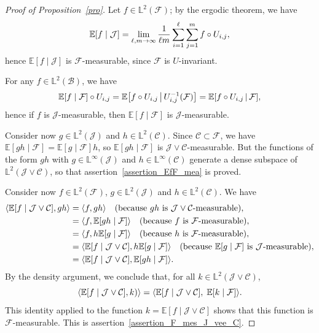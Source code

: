 \documentclass[10pt]{amsart}
\theoremstyle{definition}\newtheorem{defi}[theo]{Definition}\newtheorem{rema}[theo]{Remark}\newtheorem{exam}[theo]{Example}\newtheorem{exem}[theo]{Example}\newtheorem{nota}[theo]{Notation}
\newcommand*\bbL{\mathbb{L}}
\newcommand{\bbE}{\mathbb{E}}
\newcommand{\E}[1]{\bbE\left[#1\right]}
\newcommand*\J{\mathcal{J}}
\newcommand*\C{\mathcal{C}}
\newcommand*\B{\mathcal{B}}
\newcommand*\F{\mathcal{F}}
\renewcommand*{\to}{\mathchoice{\longrightarrow}{\rightarrow}{\rightarrow}{\rightarrow}}
\let\originalleft\left
\let\originalright\right
\renewcommand{\left}{\mathopen{}\mathclose\bgroup\originalleft}
\renewcommand{\right}{\aftergroup\egroup\originalright}
\begin{document}
\begin{proof}[Proof of Proposition~\ref{pro}]
Let $f\in \bbL^2(\F)$; by the ergodic theorem, we have
\[
\E{f\mid\J}=\lim_{\ell,m\to\infty}\frac1{\ell m}\sum_{i=1}^\ell \sum_{j=1}^mf\circ U_{i,j},
\]
hence $\bbE[f\mid\J]$ is $\F$-measurable, since $\F$ is $U$-invariant.

For any $f\in \bbL^2(\B)$, we have
\[
\E{f\mid\F}\circ U_{i,j}=\E{f\circ U_{i,j}\,\middle|\, U_{i,j}^{-1}(\F)}=\E{f\circ U_{i,j}\,\middle|\,\F},
\]
hence if $f$ is $\J$-measurable, then $\bbE[f\mid\F]$ is $\J$-measurable.

Consider now $g\in \bbL^2(\J)$ and $h\in \bbL^2(\C)$. Since $\C\subset \F$, we have $
\bbE[gh\mid\F]=\bbE[g\mid\F] h $, so $\bbE[gh\mid\F]$ is $\J\vee\C$-measurable. But the functions of the form $gh$ with $g\in \bbL^\infty(\J)$ and $h\in \bbL^\infty(\C)$ generate a dense subspace of $ \bbL^2(\J\vee\C)$, so that assertion~\eqref{assertion_EfF_mea} is proved.

Consider now $f\in \bbL^2(\F)$, $g\in \bbL^2(\J)$ and $h\in \bbL^2(\C)$. We have
\begin{align*}
\left\langle \E{f\mid\J\vee\C},gh\right\rangle &=\langle f,gh\rangle\quad\text{(because $gh$ is $\J\vee\C$-measurable)},\\
&=\langle f,\E{gh\mid\F}\rangle\quad\text{(because $f$ is $\F$-measurable)},\\
&=\langle f,h\E{g\mid\F}\rangle\quad\text{(because $h$ is $\F$-measurable)},\\
&=\langle \E{f\mid\J\vee\C},h\E{g\mid\F}\rangle \quad\text{(because $\E{g\mid\F}$ is $\J$-measurable)},\\
&=\langle \E{f\mid\J\vee\C},\E{gh\mid\F}\rangle.
\end{align*}
By the density argument, we conclude that, for all $k\in \bbL^2(\J\vee\C)$,
\[
\langle \E{f\mid\J\vee\C},k)\rangle=\langle \E{f\mid\J\vee\C},\;\E{k\mid\F}\rangle.
\]
This identity applied to the function $k= \bbE[f\mid\J\vee\C]$ shows that this function is $\F$-measurable. This is assertion~\eqref{assertion_F_mes_J_vee_C}.
\end{proof}
\end{document}

